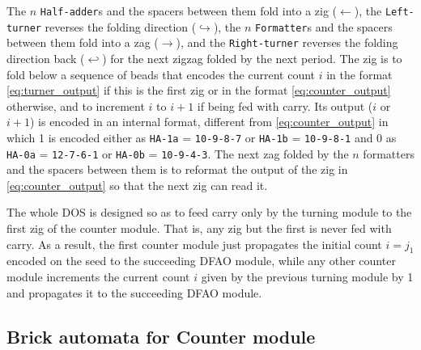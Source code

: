 \documentclass[dvipdfmx,review]{elsarticle}
\begin{document}
The $n$ \texttt{Half-adder}s and the spacers between them fold into a zig ($\leftarrow$), the \texttt{Left-turner} reverses the folding direction ($\hookrightarrow$), the $n$ \texttt{Formatter}s and the spacers between them fold into a zag ($\rightarrow$), and the \texttt{Right-turner} reverses the folding direction back ($\hookleftarrow$) for the next zigzag folded by the next period. 
The zig is to fold below a sequence of beads that encodes the current count $i$ in the format \eqref{eq:turner_output} if this is the first zig or in the format \eqref{eq:counter_output} otherwise, and to increment $i$ to $i+1$ if being fed with carry. 
Its output ($i$ or $i+1$) is encoded in an internal format, different from \eqref{eq:counter_output} in which 1 is encoded either as \texttt{HA-1a} = \texttt{10{-}9{-}8{-}7} or \texttt{HA-1b} = \texttt{10-9-8-1} and 0 as \texttt{HA-0a} = \texttt{12-7-6-1} or \texttt{HA-0b} = \texttt{10-9-4-3}. 
The next zag folded by the $n$ formatters and the spacers between them is to reformat the output of the zig in \eqref{eq:counter_output} so that the next zig can read it. 

The whole DOS is designed so as to feed carry only by the turning module to the first zig of the counter module. 
That is, any zig but the first is never fed with carry. 
As a result, the first counter module just propagates the initial count $i = j_1$ encoded on the seed to the succeeding DFAO module, while any other counter module increments the current count $i$ given by the previous turning module by 1 and propagates it to the succeeding DFAO module. 

\clearpage 

	\subsection{Brick automata for Counter module}
	\label{ap_subsect:Counter_module_BA}
\end{document}
